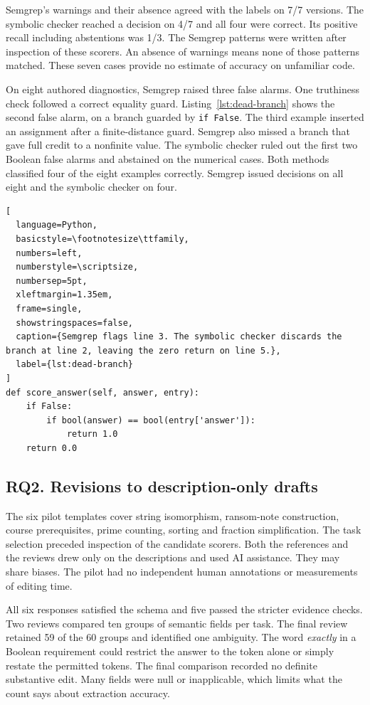 \documentclass[sigconf]{acmart}
\begin{document}
Semgrep's warnings and their absence agreed with the labels on 7/7 versions. The symbolic checker reached a decision on 4/7 and all four were correct. Its positive recall including abstentions was 1/3. The Semgrep patterns were written after inspection of these scorers. An absence of warnings means none of those patterns matched. These seven cases provide no estimate of accuracy on unfamiliar code.

On eight authored diagnostics, Semgrep raised three false alarms. One truthiness check followed a correct equality guard. Listing~\ref{lst:dead-branch} shows the second false alarm, on a branch guarded by \texttt{if False}. The third example inserted an assignment after a finite-distance guard. Semgrep also missed a branch that gave full credit to a nonfinite value. The symbolic checker ruled out the first two Boolean false alarms and abstained on the numerical cases. Both methods classified four of the eight examples correctly. Semgrep issued decisions on all eight and the symbolic checker on four.


\begin{lstlisting}[
  language=Python,
  basicstyle=\footnotesize\ttfamily,
  numbers=left,
  numberstyle=\scriptsize,
  numbersep=5pt,
  xleftmargin=1.35em,
  frame=single,
  showstringspaces=false,
  caption={Semgrep flags line 3. The symbolic checker discards the branch at line 2, leaving the zero return on line 5.},
  label={lst:dead-branch}
]
def score_answer(self, answer, entry):
    if False:
        if bool(answer) == bool(entry['answer']):
            return 1.0
    return 0.0
\end{lstlisting}

\subsection{RQ2. Revisions to description-only drafts}

The six pilot templates cover string isomorphism, ransom-note construction, course prerequisites, prime counting, sorting and fraction simplification. The task selection preceded inspection of the candidate scorers. Both the references and the reviews drew only on the descriptions and used AI assistance. They may share biases. The pilot had no independent human annotations or measurements of editing time.

All six responses satisfied the schema and five passed the stricter evidence checks. Two reviews compared ten groups of semantic fields per task. The final review retained 59 of the 60 groups and identified one ambiguity. The word \emph{exactly} in a Boolean requirement could restrict the answer to the token alone or simply restate the permitted tokens. The final comparison recorded no definite substantive edit. Many fields were null or inapplicable, which limits what the count says about extraction accuracy.
\end{document}
